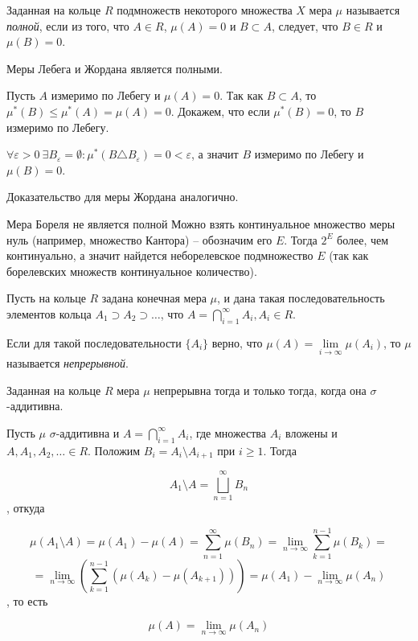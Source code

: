 \Def

Заданная на кольце $R$ подмножеств некоторого множества $X$ мера $\mu$ называется \textit{полной}, если из того, что $A \in R$, $\mu(A) = 0$ и $B \subset A$, следует, что $B \in R$ и $\mu(B) = 0$.

\Statement Меры Лебега и Жордана является полными.

\Proof
Пусть $A$ измеримо по Лебегу и $\mu(A) = 0$. Так как $B \subset A$, то $\mu^*(B) \leq \mu^*(A) = \mu(A) = 0$. Докажем, что если $\mu^*(B) = 0$, то $B$ измеримо по Лебегу.

$\forall \varepsilon > 0 \ \exists B_\varepsilon = \emptyset : \mu^*(B \triangle B_\varepsilon) = 0 < \varepsilon$, а значит $B$ измеримо по Лебегу и $\mu(B) = 0$.

Доказательство для меры Жордана аналогично.
\EndProof

\Note Мера Бореля не является полной 
Можно взять континуальное множество меры нуль (например, множество Кантора) -- обозначим его $E$. Тогда $2^E$ более, чем континуально, а значит найдется неборелевское подмножество $E$ (так как борелевских множеств континуальное количество).

\Def

Пусть на кольце $R$ задана конечная мера $\mu$, и дана такая последовательность элементов кольца $A_1 \supset A_2 \supset \ldots$, что
$A = \bigcap \limits_{i = 1}^{\infty} A_i, A_i \in R$.

Если для такой последовательности $\{ A_i \}$ верно, что $\mu(A) = \lim \limits_{i \to \infty} \mu(A_i)$, то $\mu$ называется \textit{непрерывной}.

\Th Заданная на кольце $R$ мера $\mu$ непрерывна тогда и только тогда, когда она $\sigma$-аддитивна.

\Proof

Пусть $\mu$ $\sigma$-аддитивна и $A = \bigcap \limits_{i = 1}^{\infty} A_i$, где множества $A_i$ вложены и $A, A_1, A_2, \ldots \in R$. 
Положим $B_i = A_i \setminus A_{i + 1}$ при $i \geq 1$. Тогда

$$
    A_1 \setminus A = \bigsqcup_{n = 1}^{\infty} B_n
$$, откуда

$$
    \mu(A_1 \setminus A) = \mu(A_1) - \mu(A) = \sum_{n = 1}^{\infty} \mu(B_n)
    = \lim_{n \to \infty} \sum_{k = 1}^{n - 1} \mu(B_k) = 
$$
$$
    = \lim_{n \to \infty} \left( \sum_{k = 1}^{n - 1} \left( \mu(A_k) - \mu(A_{k + 1}) \right) \right) = 
    \mu(A_1) - \lim_{n \to \infty} \mu(A_n)
$$, то есть

$$
    \mu(A) = \lim_{n \to \infty} \mu(A_n)
$$

